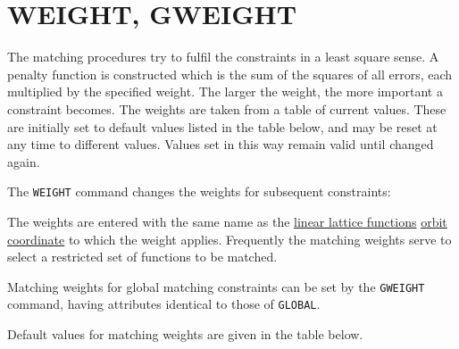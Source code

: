 \section{WEIGHT, GWEIGHT}
\label{sec:weight}\label{sec:gweight}

The matching procedures try to fulfil the constraints
in a least square sense.
A penalty function is constructed which is the sum of the
squares of all errors, each multiplied by the specified weight.
The larger the weight, the more important a constraint becomes.
The weights are taken from a table of current values.
These are initially set to default values listed in the table below,
and may be reset at any time to different values.
Values set in this way remain valid until changed again.

The {\tt WEIGHT} command changes the weights for subsequent
constraints: 

The weights are entered with the same name as the
\href{../Introduction/tables.html#linear}{linear lattice functions}
\href{../Introduction/closed_orbit.html}{orbit coordinate} 
to which the weight applies.
Frequently the matching weights serve to select a restricted
set of functions to be matched.


Matching weights for global matching constraints can be set by the 
{\tt GWEIGHT} command, having attributes identical to those of
{\tt GLOBAL}.



Default values for matching weights are given in the table below.

